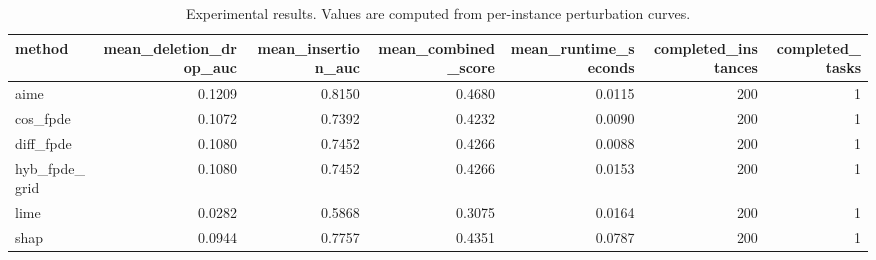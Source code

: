 \begin{table}[t]
\caption{Experimental results. Values are computed from per-instance perturbation curves.}
\label{tab:main_results_computed}
\centering
\begin{tabular}{lrrrrrr}
\toprule
method & mean\_deletion\_drop\_auc & mean\_insertion\_auc & mean\_combined\_score & mean\_runtime\_seconds & completed\_instances & completed\_tasks \\
\midrule
aime & 0.1209 & 0.8150 & 0.4680 & 0.0115 & 200 & 1 \\
cos\_fpde & 0.1072 & 0.7392 & 0.4232 & 0.0090 & 200 & 1 \\
diff\_fpde & 0.1080 & 0.7452 & 0.4266 & 0.0088 & 200 & 1 \\
hyb\_fpde\_grid & 0.1080 & 0.7452 & 0.4266 & 0.0153 & 200 & 1 \\
lime & 0.0282 & 0.5868 & 0.3075 & 0.0164 & 200 & 1 \\
shap & 0.0944 & 0.7757 & 0.4351 & 0.0787 & 200 & 1 \\
\bottomrule
\end{tabular}

\end{table}
